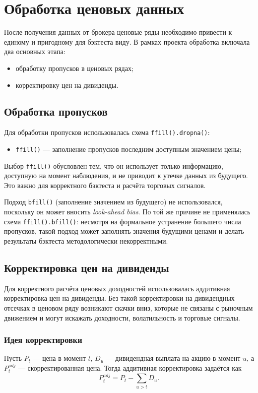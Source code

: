 \documentclass[12pt]{article}
\begin{document}
\section{Обработка ценовых данных}

После получения данных от брокера ценовые ряды необходимо привести к единому и пригодному для бэктеста виду. В рамках проекта обработка включала два основных этапа:
\begin{itemize}
    \item обработку пропусков в ценовых рядах;
    \item корректировку цен на дивиденды.
\end{itemize}

\subsection*{Обработка пропусков}

Для обработки пропусков использовалась схема \texttt{ffill().dropna()}:
\begin{itemize}
    \item \texttt{ffill()} --- заполнение пропусков последним доступным значением цены;
\end{itemize}

Выбор \texttt{ffill()} обусловлен тем, что он использует только информацию, доступную на момент наблюдения, и не приводит к утечке данных из будущего. Это важно для корректного бэктеста и расчёта торговых сигналов.

Подход \texttt{bfill()} (заполнение значением из будущего) не использовался, поскольку он может вносить \textit{look-ahead bias}. По той же причине не применялась схема \texttt{ffill().bfill()}: несмотря на формальное устранение большего числа пропусков, такой подход может заполнять значения будущими ценами и делать результаты бэктеста методологически некорректными.

\subsection*{Корректировка цен на дивиденды}

Для корректного расчёта ценовых доходностей использовалась аддитивная корректировка цен на дивиденды. Без такой корректировки на дивидендных отсечках в ценовом ряду возникают скачки вниз, которые не связаны с рыночным движением и могут искажать доходности, волатильность и торговые сигналы.

\subsubsection*{Идея корректировки}
Пусть $P_t$ --- цена в момент $t$, $D_u$ --- дивидендная выплата на акцию в момент $u$, а $P_t^{adj}$ --- скорректированная цена. Тогда аддитивная корректировка задаётся как
\[
P_t^{adj} = P_t - \sum_{u>t} D_u.
\]
\end{document}
